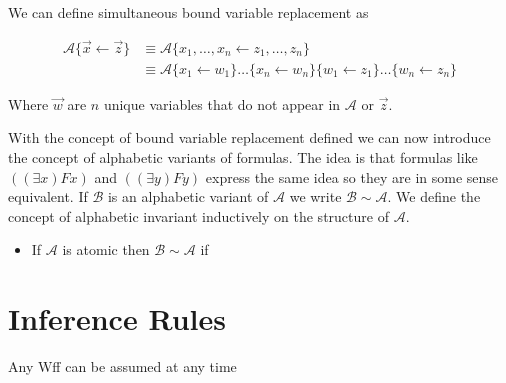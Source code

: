 \documentclass[12pt]{article}
\newcommand{\mc}[1]{\mathcal{#1}}
\begin{document}
We can define simultaneous bound variable replacement as

\begin{align}
\mc{A}\{\vec{x} \leftarrow \vec{z}\} &\equiv \mc{A}\{x_1,\ldots,x_n\leftarrow z_1,\ldots, z_n\}\\
&\equiv \mc{A}\{x_1\leftarrow w_1\}\ldots\{x_n\leftarrow w_n\}\{w_1\leftarrow z_1\}\ldots\{w_n\leftarrow z_n\}
\end{align}

Where $\vec{w}$ are $n$ unique variables that do not appear in $\mc{A}$ or $\vec{z}$.

With the concept of bound variable replacement defined we can now introduce the concept of alphabetic variants of formulas. The idea is that formulas like $((\exists x)Fx)$ and $((\exists y)Fy)$ express the same idea so they are in some sense equivalent. If $\mc{B}$ is an alphabetic variant of $\mc{A}$ we write $\mc{B} \sim \mc{A}$. We define the concept of alphabetic invariant inductively on the structure of $\mc{A}$.


\begin{itemize}
\item{If $\mc{A}$ is atomic then $\mc{B}\sim\mc{A}$ if }
\end{itemize}


\newpage

\section{Inference Rules}

\hrulefill
\begin{ND}[Rule of $A$][][][][.6\linewidth]
\ndljg{j}{(j)}{$\mc{A}$}{$A$}
\end{ND}
Any Wff can be assumed at any time
\end{document}
